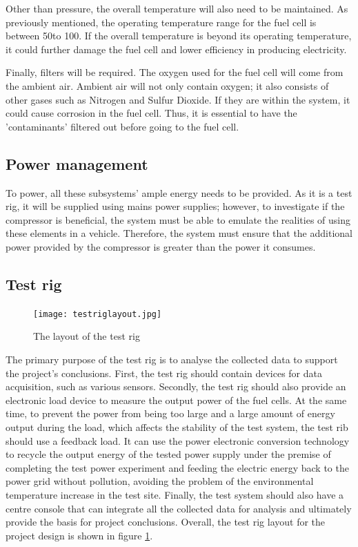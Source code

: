 \documentclass[a4paper,11pt]{article}
\begin{document}
Other than pressure, the overall temperature will also need to be maintained. As previously mentioned, the operating temperature range for the fuel cell is between 50\degree to 100\degree. If the overall temperature is beyond its operating temperature, it could further damage the fuel cell and lower efficiency in producing electricity\cite{lumley2009engines}.

Finally, filters will be required. The oxygen used for the fuel cell will come from the ambient air. Ambient air will not only contain oxygen; it also consists of other gases such as Nitrogen and Sulfur Dioxide\cite{ozyalcin2021investigation}. If they are within the system, it could cause corrosion in the fuel cell. Thus, it is essential to have the 'contaminants' filtered out before going to the fuel cell.

\subsection{Power management}
To power, all these subsystems' ample energy needs to be provided.  As it is a test rig, it will be supplied using mains power supplies; however, to investigate if the compressor is beneficial, the system must be able to emulate the realities of using these elements in a vehicle. Therefore, the system must ensure that the additional power provided by the compressor is greater than the power it consumes.

\subsection{Test rig}

\begin{figure}[h]
    \centering
    \texttt{[image: testriglayout.jpg]}
    \caption{The layout of the test rig}
    \label{fig:testriglayout}  
\end{figure}

The primary purpose of the test rig is to analyse the collected data to support the project's conclusions. First, the test rig should contain devices for data acquisition, such as various sensors. Secondly, the test rig should also provide an electronic load device to measure the output power of the fuel cells. At the same time, to prevent the power from being too large and a large amount of energy output during the load, which affects the stability of the test system, the test rib should use a feedback load. It can use the power electronic conversion technology to recycle the output energy of the tested power supply under the premise of completing the test power experiment and feeding the electric energy back to the power grid without pollution, avoiding the problem of the environmental temperature increase in the test site. Finally, the test system should also have a centre console that can integrate all the collected data for analysis and ultimately provide the basis for project conclusions. Overall, the test rig layout for the project design is shown in figure \ref{fig:testriglayout}.
\end{document}

